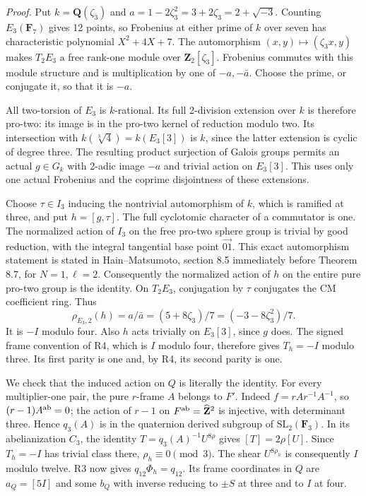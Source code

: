 \emph{Proof.}
Put $k=\mathbf Q(\zeta_3)$ and
$a=1-2\zeta_3^2=3+2\zeta_3=2+\sqrt{-3}$. Counting
$E_3(\mathbf F_7)$ gives 12 points, so Frobenius at either
prime of $k$ over seven has characteristic polynomial
$X^2+4X+7$. The automorphism $(x,y)\mapsto(\zeta_3x,y)$
makes $T_2E_3$ a free rank-one module over
$\mathbf Z_2[\zeta_3]$. Frobenius commutes with this module
structure and is multiplication by one of $-a,-\bar a$.
Choose the prime, or conjugate it, so that it is $-a$.

All two-torsion of $E_3$ is $k$-rational. Its full 2-division
extension over $k$ is therefore pro-two: its image is in the
pro-two kernel of reduction modulo two. Its intersection with
$k(\sqrt[3]4)=k(E_3[3])$ is $k$, since the latter extension is
cyclic of degree three. The resulting product surjection of
Galois groups permits an actual $g\in G_k$ with 2-adic image
$-a$ and trivial action on $E_3[3]$. This uses only one actual
Frobenius and the coprime disjointness of these extensions.

Choose $\tau\in I_3$ inducing the nontrivial automorphism of
$k$, which is ramified at three, and put $h=[g,\tau]$.
The full cyclotomic character of a commutator is one. The
normalized action of $I_3$ on the free pro-two sphere group is
trivial by good reduction, with the integral tangential base
point $\overrightarrow{01}$. This exact automorphism statement
is stated in Hain--Matsumoto, section 8.5 immediately before
Theorem 8.7, for $N=1,\ell=2$. Consequently the normalized
action of $h$ on the entire pure pro-two group is the identity.
On $T_2E_3$, conjugation by $\tau$ conjugates the CM coefficient
ring. Thus
\[
 \rho_{E_3,2}(h)=a/\bar a=(5+8\zeta_3)/7
                    =(-3-8\zeta_3^2)/7.
\]
It is $-I$ modulo four. Also $h$ acts trivially on $E_3[3]$,
since $g$ does. The signed frame convention of R4, which is
$I$ modulo four, therefore gives $T_h=-I$ modulo three.
Its first parity is one and, by R4, its second parity is one.

We check that the induced action on $Q$ is literally the identity.
For every multiplier-one pair, the pure $r$-frame $A$ belongs
to $F'$. Indeed $f=rAr^{-1}A^{-1}$, so
$(r-1)A^{\rm ab}=0$; the action of $r-1$ on
$F^{\rm ab}=\widehat{\mathbf Z}^2$ is injective, with determinant
three. Hence $q_3(A)$ is in the quaternion derived subgroup of
$\mathrm{SL}_2(\mathbf F_3)$. In its abelianization $C_3$, the
identity $T=q_3(A)^{-1}U^{8\rho}$ gives $[T]=2\rho[U]$.
Since $T_h=-I$ has trivial class there, $\rho_h\equiv0\pmod3$.
The shear $U^{8\rho_h}$ is consequently $I$ modulo twelve.
R3 now gives $q_{12}\Phi_h=q_{12}$. Its frame coordinates in
$Q$ are $a_Q=[5I]$ and some $b_Q$ with inverse reducing to
$\pm S$ at three and to $I$ at four.

